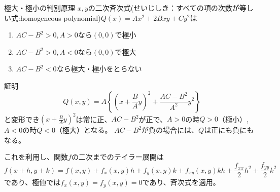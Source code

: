 %
%

\begin{slide}{極大・極小の判別原理}
$x,y$の二次斉次式(せいじしき：すべての項の次数が等しい式:homogeneous polynomial)$Q(x) = Ax^2 + 2Bxy+ Cy^2$は
\begin{enumerate}
\item $AC-B^2>0, A>0$なら$(0,0)$で極小
\item $AC-B^2>0, A<0$なら$(0,0)$で極大
\item $AC-B^2<0$なら極大・極小をとらない
\end{enumerate}
証明
\begin{equation}
Q(x,y) = A\left\{\left(x + \frac{B}{A}y\right)^2 + \frac{AC-B^2}{A^2}y^2\right\}\nonumber 
\end{equation}
と変形でき$(x + \frac{B}{A}y)^2$は常に正、$AC-B^2$が正で、$A>0$の時$Q>0$（極小）, $A<0$の時$Q<0$（極大）となる。
$AC-B^2$が負の場合には、$Q$は正にも負にもなる。

これを利用し、関数$f$の二次までのテイラー展開は
\begin{equation}
f(x+h, y+k) = f(x,y) + f_x(x,y)h + f_y(x,y)k + f_{xy}(x,y)kh + \frac{f_{xx}}{2}h^2 + \frac{f_{yy}}{2}k^2 \nonumber
\end{equation}
であり、極値では$f_x(x,y)=f_y(x,y)=0$であり、斉次式を適用。
\end{slide}

